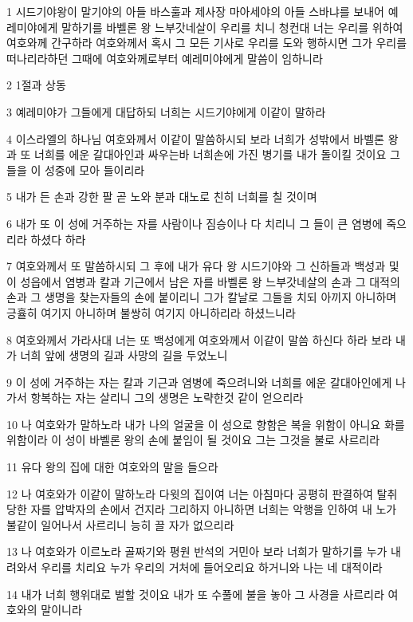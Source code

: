 \par 1 시드기야왕이 말기야의 아들 바스훌과 제사장 마아세야의 아들 스바냐를 보내어 예레미야에게 말하기를 바벨론 왕 느부갓네살이 우리를 치니 청컨대 너는 우리를 위하여 여호와께 간구하라 여호와께서 혹시 그 모든 기사로 우리를 도와 행하시면 그가 우리를 떠나리라하던 그때에 여호와께로부터 예레미야에게 말씀이 임하니라
\par 2 1절과 상동
\par 3 예레미야가 그들에게 대답하되 너희는 시드기야에게 이같이 말하라
\par 4 이스라엘의 하나님 여호와께서 이같이 말씀하시되 보라 너희가 성밖에서 바벨론 왕과 또 너희를 에운 갈대아인과 싸우는바 너희손에 가진 병기를 내가 돌이킬 것이요 그들을 이 성중에 모아 들이리라
\par 5 내가 든 손과 강한 팔 곧 노와 분과 대노로 친히 너희를 칠 것이며
\par 6 내가 또 이 성에 거주하는 자를 사람이나 짐승이나 다 치리니 그 들이 큰 염병에 죽으리라 하셨다 하라
\par 7 여호와께서 또 말씀하시되 그 후에 내가 유다 왕 시드기야와 그 신하들과 백성과 및 이 성읍에서 염병과 칼과 기근에서 남은 자를 바벨론 왕 느부갓네살의 손과 그 대적의 손과 그 생명을 찾는자들의 손에 붙이리니 그가 칼날로 그들을 치되 아끼지 아니하며 긍휼히 여기지 아니하며 불쌍히 여기지 아니하리라 하셨느니라
\par 8 여호와께서 가라사대 너는 또 백성에게 여호와께서 이같이 말씀 하신다 하라 보라 내가 너희 앞에 생명의 길과 사망의 길을 두었노니
\par 9 이 성에 거주하는 자는 칼과 기근과 염병에 죽으려니와 너희를 에운 갈대아인에게 나가서 항복하는 자는 살리니 그의 생명은 노략한것 같이 얻으리라
\par 10 나 여호와가 말하노라 내가 나의 얼굴을 이 성으로 향함은 복을 위함이 아니요 화를 위함이라 이 성이 바벨론 왕의 손에 붙임이 될 것이요 그는 그것을 불로 사르리라
\par 11 유다 왕의 집에 대한 여호와의 말을 들으라
\par 12 나 여호와가 이같이 말하노라 다윗의 집이여 너는 아침마다 공평히 판결하여 탈취 당한 자를 압박자의 손에서 건지라 그리하지 아니하면 너희는 악행을 인하여 내 노가 불같이 일어나서 사르리니 능히 끌 자가 없으리라
\par 13 나 여호와가 이르노라 골짜기와 평원 반석의 거민아 보라 너희가 말하기를 누가 내려와서 우리를 치리요 누가 우리의 거처에 들어오리요 하거니와 나는 네 대적이라
\par 14 내가 너희 행위대로 벌할 것이요 내가 또 수풀에 불을 놓아 그 사경을 사르리라 여호와의 말이니라

